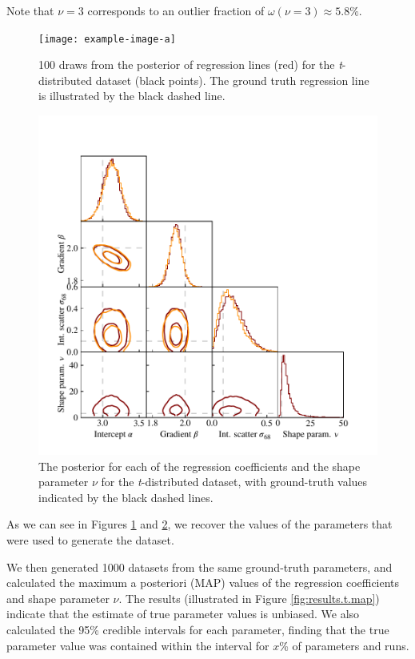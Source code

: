 \documentclass[fleqn,usenatbib]{mnras}
\begin{document}
Note that $\nu = 3$ corresponds to an outlier fraction of $\omega(\nu = 3)
\approx 5.8 \%$.

\begin{figure}
    \texttt{[image: example-image-a]}
    \caption{{\color{red} 100} draws from the posterior of regression lines
    (red) for the \textit{t}-distributed dataset (black points). The ground
    truth regression line is illustrated by the black dashed line.}
    \label{fig:results.t.regression}
\end{figure}

\begin{figure}
    \includegraphics[width=\columnwidth]{graphics/corner_t.pdf}
    \caption{The posterior for each of the regression coefficients and the shape
    parameter $\nu$ for the \textit{t}-distributed dataset, with ground-truth
    values indicated by the black dashed lines.}
    \label{fig:results.t.corner}
\end{figure}

As we can see in Figures \ref{fig:results.t.regression} and
\ref{fig:results.t.corner}, we recover the values of the parameters that were
used to generate the dataset.

We then generated 1000 datasets from the same ground-truth parameters, and
calculated the maximum a posteriori (MAP) values of the regression coefficients
and shape parameter $\nu$. The results (illustrated in Figure
\ref{fig:results.t.map}) indicate that the estimate of true parameter values is
unbiased.{
\color{red} We also calculated the 95\% credible intervals for each parameter,
finding that the true parameter value was contained within the interval for
$x$\% of parameters and runs.
}
\end{document}
